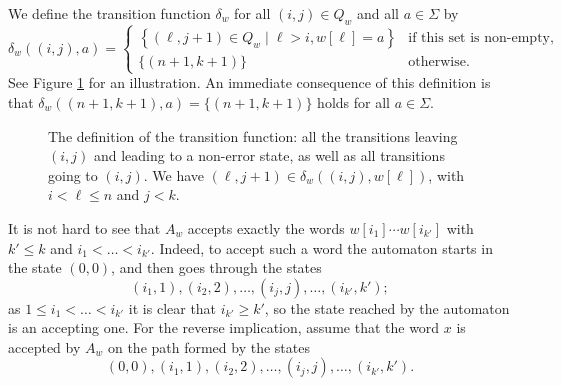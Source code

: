 \documentclass[runningheads]{llncs}
\begin{document}
We define the transition function $\delta_w$ for all $(i,j)\in Q_w$ and all $a\in\Sigma$ by
\begin{equation*}
	\delta_w\left(\left(i,j\right),a\right)= \begin{cases}
		\left\{(\ell,j+1)\in Q_w \mid \ell>i, w[\ell]=a\right\} & \text{if this set is non-empty},\\
		\{(n+1, k+1)\} & \text{otherwise.}
	\end{cases}
\end{equation*}
See Figure \ref{fig1} for an illustration. An immediate consequence of this definition is that  $\delta_w((n+1,k+1),a)=\{(n+1, k+1)\}$ holds for all $a\in\Sigma$.
\begin{figure}
\begin{center}
\end{center}
\caption{The definition of the transition function: all the transitions leaving $(i,j)$ and leading to a non-error state, as well as all transitions going to $(i,j)$. We have $(\ell, j+1)\in \delta_w( (i,j), w[\ell])$, with $i<\ell\leq n$ and $ j<k$.
}
\label{fig1}
\end{figure}

It is not hard to see that $A_w$ accepts exactly the words $w[i_1]\cdots w[i_{k'}]$ with $k'\leq k$ and $i_1< \ldots < i_{k'}$. Indeed, to accept such a word the automaton starts in the state $(0,0)$, and then goes through the states 
$$(i_1,1), (i_2,2),\ldots, (i_j,j), \ldots, (i_{k'},k');$$ 
as $1\leq i_1< \ldots < i_{k'}$ it is clear that $i_{k'}\geq k'$, so the state reached by the automaton is an accepting one. For the reverse implication, assume that the word $x$ is accepted by $A_w$ on the path formed by the states 
$$(0,0), (i_1,1), (i_2,2),\ldots, (i_j,j), \ldots, (i_{k'},k').$$ 
\end{document}

